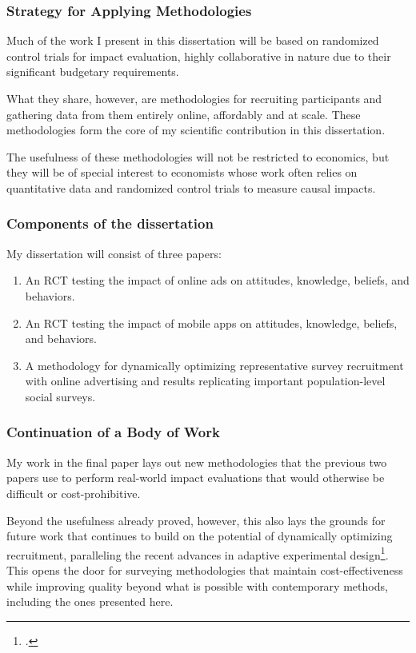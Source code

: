 \documentclass[aspectratio=169]{beamer}
\begin{document}
\begin{frame}
\frametitle{Strategy for Applying Methodologies} 

Much of the work I present in this dissertation will be based on randomized control trials for impact evaluation, highly collaborative in nature due to their significant budgetary requirements. 

What they share, however, are methodologies for recruiting participants and gathering data from them entirely online, affordably and at scale. These methodologies form the core of my scientific contribution in this dissertation.  

The usefulness of these methodologies will not be restricted to economics, but they will be of special interest to economists whose work often relies on quantitative data and randomized control trials to measure causal impacts. 

\end{frame} 

\begin{frame}
\frametitle{Components of the dissertation} 

My dissertation will consist of three papers:

\begin{enumerate}
\item An RCT testing the impact of online ads on attitudes, knowledge, beliefs, and behaviors. 
\item An RCT testing the impact of mobile apps on attitudes, knowledge, beliefs, and behaviors. 
\item A methodology for dynamically optimizing representative survey recruitment with online advertising and results replicating important population-level social surveys.
\end{enumerate} 

\end{frame}

\begin{frame}
  \frametitle{Continuation of a Body of Work} 

My work in the final paper lays out new methodologies that the previous two papers use to perform real-world impact evaluations that would otherwise be difficult or cost-prohibitive.

Beyond the usefulness already proved, however, this also lays the grounds for future work that continues to build on the potential of dynamically optimizing recruitment, paralleling the recent advances in adaptive experimental design\footcite{Kasy2021,Atan2020}. This opens the door for surveying methodologies that maintain cost-effectiveness while improving quality beyond what is possible with contemporary methods, including the ones presented here. 

\end{frame}
\end{document}
